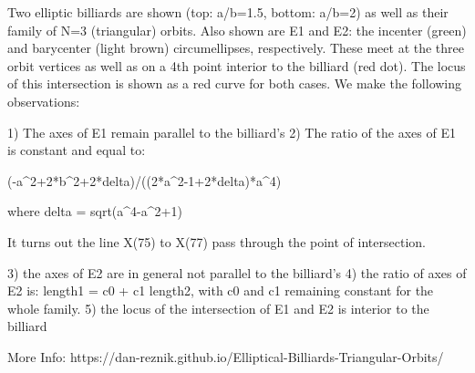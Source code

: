 Two elliptic billiards are shown (top: a/b=1.5, bottom: a/b=2) as well as their family of N=3 (triangular) orbits. Also shown are E1 and E2: the incenter (green) and barycenter (light brown) circumellipses, respectively. These meet at the three orbit vertices as well as on a 4th point interior to the billiard (red dot). The locus of this intersection is shown as a red curve for both cases. We make the following observations:

1) The axes of E1 remain parallel to the billiard's
2) The ratio of the axes of E1 is constant and equal to:

(-a^2+2*b^2+2*delta)/((2*a^2-1+2*delta)*a^4)

where delta = sqrt(a^4-a^2+1)

It turns out the line X(75) to X(77) pass through the point of intersection.

3) the axes of E2 are in general not parallel to the billiard's
4) the ratio of axes of E2 is: length1 = c0 + c1 length2, with c0 and c1 remaining constant for the whole family.
5) the locus of the intersection of E1 and E2 is interior to the billiard

More Info:  https://dan-reznik.github.io/Elliptical-Billiards-Triangular-Orbits/